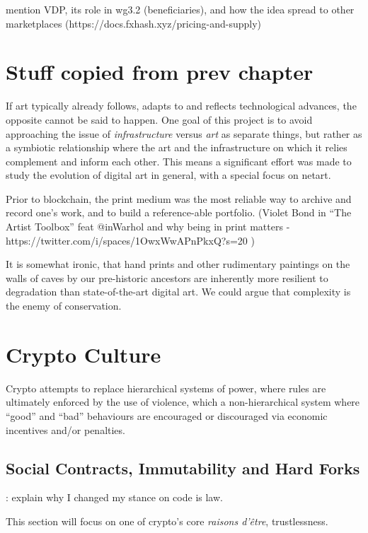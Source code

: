 mention VDP, its role in wg3.2 (beneficiaries), and how the idea spread to other marketplaces (https://docs.fxhash.xyz/pricing-and-supply)




\section{Stuff copied from prev chapter}



If art typically already follows, adapts to and reflects technological advances, the opposite cannot be said to happen. One goal of this project is to avoid approaching the issue of \emph{infrastructure} versus \emph{art} as separate things, but rather as a symbiotic relationship where the art and the infrastructure on which it relies complement and inform each other. This means a significant effort was made to study the evolution of digital art in general, with a special focus on netart. 

Prior to blockchain, the print medium was the most reliable way to archive and record one's work, and to build a reference-able portfolio. (Violet Bond in ``The Artist Toolbox'' feat @inWarhol and why being in print matters - https://twitter.com/i/spaces/1OwxWwAPnPkxQ?s=20 )

It is somewhat ironic, that hand prints and other rudimentary paintings on the walls of caves by our pre-historic ancestors are inherently more resilient to degradation than state-of-the-art digital art. We could argue that complexity is the enemy of conservation.


\section{Crypto Culture}


Crypto attempts to replace hierarchical systems of power, where rules are ultimately enforced by the use of violence, which a non-hierarchical system where ``good'' and ``bad'' behaviours are encouraged or discouraged via economic incentives and/or penalties.



\subsection{Social Contracts, Immutability and Hard Forks}


\todo : explain why I changed my stance on code is law.

This section will focus on one of crypto's core \emph{raisons d'être}, trustlessness.

